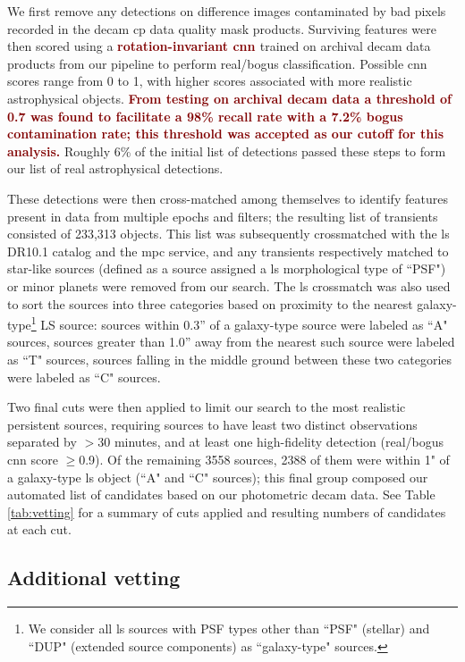 \documentclass[twocolumn]{aastex631}
\newcommand{\response}[1]{\textbf{\textcolor{maroon}{#1}}}
\begin{document}
We first remove any detections on difference images contaminated by bad pixels recorded in the \gls{decam} \gls{cp} data quality mask products.
Surviving features were then scored using a \response{rotation-invariant \gls{cnn} \citep{2017ApJ...836...97C, 2022FrASS...9.7100S}} trained on archival \gls{decam} data products from our pipeline to perform real/bogus classification.
Possible \gls{cnn} scores range from 0 to 1, with higher scores associated with more realistic astrophysical objects.
\response{From testing on archival \gls{decam} data a threshold of 0.7 was found to facilitate a 98\% recall rate with a 7.2\% bogus contamination rate; this threshold was accepted as our cutoff for this analysis.}
Roughly 6\% of the initial list of detections passed these steps to form our list of real astrophysical detections.

These detections were then cross-matched among themselves to identify features present in data from multiple epochs and filters; the resulting list of transients consisted of 233,313 objects.
This list was subsequently crossmatched with the \gls{ls} DR10.1 catalog \citep{Dey2019} and the \gls{mpc} service, and any transients respectively matched to star-like sources (defined as a source assigned a \gls{ls} morphological type of ``PSF") or minor planets were removed from our search.
The \gls{ls} crossmatch was also used to sort the sources into three categories based on proximity to the nearest galaxy-type\footnote{We consider all \gls{ls} sources with PSF types other than ``PSF" (stellar) and ``DUP" (extended source components) as ``galaxy-type" sources.} LS source: sources within 0.3” of a galaxy-type source were labeled as ``A" sources,
sources greater than 1.0” away from the nearest such source were labeled as ``T" sources, sources falling in the middle ground between these two categories were labeled as ``C" sources.

Two final cuts were then applied to limit our search to the most realistic persistent sources, requiring sources to have least two distinct observations separated by $>$30 minutes, and at least one high-fidelity detection (real/bogus \gls{cnn} score $\ge$0.9).
Of the remaining 3558 sources, 2388 of them were within 1" of a galaxy-type \gls{ls} object (``A" and ``C" sources); this final group composed our automated list of candidates based on our photometric \gls{decam} data.
See Table \ref{tab:vetting} for a summary of cuts applied and resulting numbers of candidates at each cut.

\subsection{Additional vetting} %
\label{subsec:handsvet}
\end{document}
